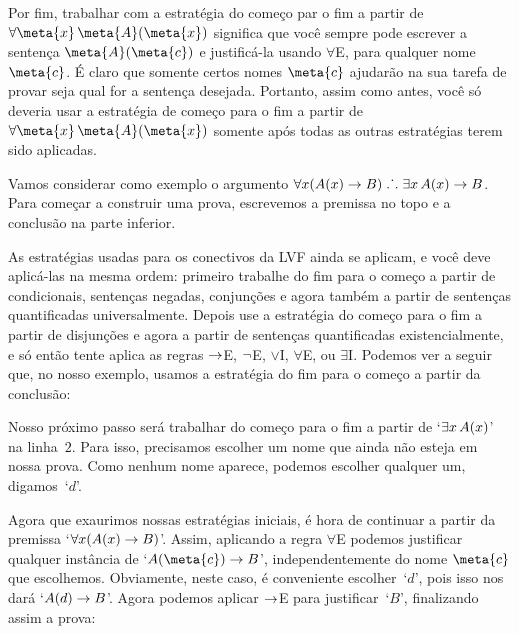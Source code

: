 Por fim, trabalhar com a estrat\'egia do come\c co par o fim a partir de $\forall \meta{x}\, \atom{\meta{A}}{\meta{x}}$ significa que voc\^e sempre pode escrever a senten\c ca $\atom{\meta{A}}{\meta{c}}$ e justific\'a-la usando $\forall$E, para qualquer nome~$\meta{c}$.  \'E claro que somente certos nomes $\meta{c}$ ajudar\~ao na sua tarefa de provar seja qual for a senten\c ca desejada. Portanto, assim como antes, voc\^e s\'o deveria  usar a estrat\'egia de come\c co para o fim a partir de  $\forall \meta{x}\, \atom{\meta{A}}{\meta{x}}$ somente ap\'os todas as outras estrat\'egias terem sido aplicadas.

Vamos considerar como exemplo o argumento $\forall x(\mathord{A}(x) \rightarrow B) \mathrel{\ldotp\dot{}\,\ldotp} \exists x\,\mathord{A}(x) \rightarrow B$. Para come\c car a construir uma prova, escrevemos a premissa no topo e a conclus\~ao na parte inferior.
\begin{fitchproof}
\ellipsesline
{}
\end{fitchproof}
As estrat\'egias usadas para os conectivos da LVF ainda se aplicam, e voc\^e deve aplic\'a-las na mesma ordem: primeiro trabalhe do fim para o come\c co a partir de condicionais, senten\c cas negadas, conjun\c c\~oes e agora tamb\'em a partir de  senten\c cas quantificadas universalmente. Depois use a estrat\'egia do come\c co para o fim a partir de  disjun\c c\~oes e agora a partir de senten\c cas quantificadas existencialmente, e s\'o ent\~ao tente aplica as regras $\rightarrow$E, $\neg$E, $\lor$I, $\forall$E, ou $\exists$I. Podemos ver a seguir que, no nosso exemplo, usamos a estrat\'egia do fim para o come\c co a partir da conclus\~ao:
 
\begin{fitchproof}
	\open
	\ellipsesline
	\close
\end{fitchproof}
Nosso pr\'oximo passo ser\'a trabalhar do come\c co para o fim a partir de `$\exists x\,\mathord{A}(x)$' na linha~$2$. Para isso, precisamos escolher um nome que ainda n\~ao esteja em nossa prova. Como nenhum nome aparece, podemos escolher qualquer um, digamos~`$d$'.
\begin{fitchproof}
	\open
	\open
	\ellipsesline
	\close
	\close
\end{fitchproof}
Agora que exaurimos nossas estrat\'egias iniciais,  \'e hora de continuar  a partir da premissa `$\forall x(\mathord{A}(x) \rightarrow B)$'. Assim, aplicando a regra $\forall$E podemos justificar qualquer inst\^ancia de `$A(\meta{c}) \eif B$', independentemente do nome $\meta{c}$ que escolhemos. Obviamente, neste caso, \'e conveniente  escolher~`$d$', pois isso nos dará  `$\mathord{A}(d) \rightarrow B$'. Agora podemos aplicar $\rightarrow$E para justificar~`$B$', finalizando assim a prova:

